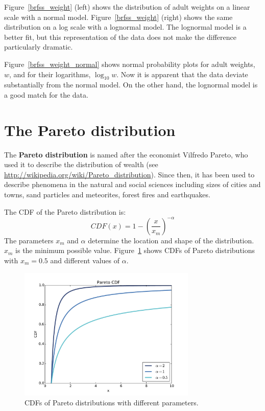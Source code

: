 \documentclass[12pt]{book}
\begin{document}
Figure~\ref{brfss_weight} (left) shows the distribution of adult
weights on a linear scale with a normal model.
Figure~\ref{brfss_weight} (right) shows the same distribution on a log
scale with a lognormal model.  The lognormal model is a better fit,
but this representation of the data does not make the difference
particularly dramatic.   

Figure~\ref{brfss_weight_normal} shows normal probability plots for
adult weights, $w$, and for their logarithms, $\log_{10} w$.  Now it
is apparent that the data deviate substantially from the normal model.
On the other hand, the lognormal model is a good match for the data.
 
 
 
  
 


\section{The Pareto distribution}

The {\bf Pareto distribution} is named after the economist Vilfredo Pareto,
who used it to describe the distribution of wealth (see
\url{http://wikipedia.org/wiki/Pareto_distribution}).  Since then, it
has been used to describe phenomena in the natural and social sciences
including sizes of cities and towns, sand particles and meteorites,
forest fires and earthquakes.  

The CDF of the Pareto distribution is:
%
\[ CDF(x) = 1 - \left( \frac{x}{x_m} \right) ^{-\alpha} \]
%
The parameters $x_{m}$ and $\alpha$ determine the location and shape
of the distribution. $x_{m}$ is the minimum possible value.
Figure~\ref{analytic_pareto_cdf} shows CDFs of Pareto
distributions with $x_{m} = 0.5$ and different values
of $\alpha$.

\begin{figure}
\centerline{\includegraphics[height=2.5in]{figs/analytic_pareto_cdf.pdf}}
\caption{CDFs of Pareto distributions with different parameters.}
\label{analytic_pareto_cdf}
\end{figure}
\end{document}
